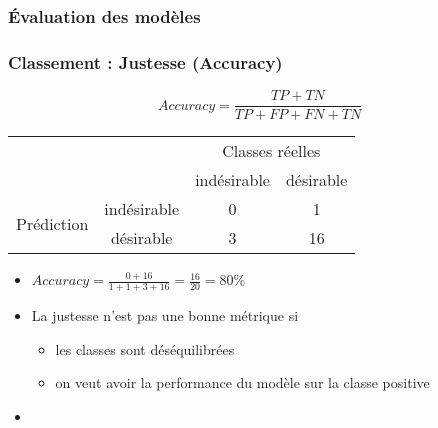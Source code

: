 \documentclass[xcolor=table]{beamer}
\begin{document}
\begin{frame}
	\frametitle{Évaluation des modèles}
	\frametitle{Classement : Justesse (Accuracy)}
	
	\[Accuracy = \frac{TP + TN}{TP + FP + FN + TN}\]
	
	\begin{tabular}{|c|c|c|c|}
		\cline{3-4}
		\multicolumn{2}{c|}{}& \multicolumn{2}{c|}{Classes réelles} \\
		\cline{3-4}
		\multicolumn{2}{c|}{}& indésirable & désirable \\
		\hline
		\multirow{2}{*}{Prédiction} & indésirable & 0 & 1 \\
		\cline{2-4}
		& désirable & 3 & 16 \\
		\hline
	\end{tabular}
	
	\begin{itemize}
		\item $Accuracy = \frac{0 + 16}{1 + 1 + 3 + 16} = \frac{16}{20} = 80\%$
		\item La justesse n'est pas une bonne métrique si 
		\begin{itemize}
			\item les classes sont déséquilibrées
			\item on veut avoir la performance du modèle sur la classe positive
		\end{itemize}
		\item {}
	\end{itemize}
	
\end{frame}
\end{document}
